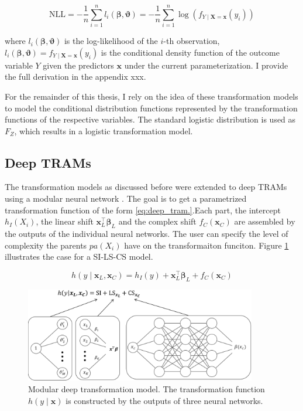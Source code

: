 \begin{equation}
\text{NLL} = - \frac{1}{n} \sum_{i=1}^{n} l_i(\boldsymbol{\beta}, \boldsymbol{\vartheta} ) = - \frac{1}{n} \sum_{i=1}^{n} \log (f_{Y \mid \mathbf{X} = \mathbf{x}}(y_i))
\label{eq:nll_tram}
\end{equation}

where $l_i(\boldsymbol{\beta}, \boldsymbol{\vartheta})$ is the log-likelihood of the $i$-th observation,  $l_i(\boldsymbol{\beta}, \boldsymbol{\vartheta}) = f_{Y \mid \mathbf{X} = \mathbf{x}}(y_i)$ is the conditional density function of the outcome variable $Y$ given the predictors $\mathbf{x}$ under the current parameterization. I provide the full derivation in the appendix xxx.


For the remainder of this thesis, I rely on the idea of these transformation models to model the conditional distribution functions represented by the transformation functions of the respective variables. The standard logistic distribution is used as $F_Z$, which results in a logistic transformation model.


\subsection{Deep TRAMs} \label{sec:deep_trams}

The transformation models as discussed before were extended to deep TRAMs using a modular neural network \citep{sick2020}. The goal is to get a parametrized transformation function of the form \ref{eq:deep_tram.}.Each part, the intercept $h_I(X_i)$, the linear shift $\mathbf{x}_L^\top \boldsymbol{\beta}_L$ and the complex shift $f_C(\mathbf{x}_C)$ are assembled by the outputs of the individual neural networks. The user can specify the level of complexity the parents $pa(X_i)$ have on the transformaiton funciton. Figure \ref{fig:deep_tram} illustrates the case for a SI-LS-CS model.

\begin{equation}
h(y \mid \mathbf{x}_L, \mathbf{x}_C ) = h_I(y) + \mathbf{x}_L^\top \boldsymbol{\beta}_L + f_C(\mathbf{x}_C)
\label{eq:deep_tram}
\end{equation}



\begin{figure}[H]
\centering
\includegraphics[width=0.9\textwidth]{img/deep_tram.png}
\caption{Modular deep transformation model. The transformation function $h(y \mid \mathbf{x})$ is constructed by the outputs of three neural networks.}
\label{fig:deep_tram}
\end{figure}

